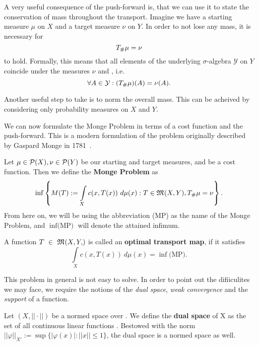 A very useful consequence of the push-forward is, that we can use it to state the conservation of mass throughout the transport. Imagine we have a starting measure $\mu$ on $X$ and a target measure $\nu$ on $Y$. In order to not lose any mass, it is necessary for
\[ {T}_{\#} \mu = \nu \]
to hold. Formally, this means that all elements of the underlying $\sigma$-algebra $\mathcal{Y}$ on $Y$ coincide under the measures $\nu$ and \push{\mu}, i.e.
\[ \forall A \in \mathcal{Y}: ({T}_{\#} \mu)(A) = \nu(A).\]

Another useful step to take is to norm the overall mass. This can be acheived by considering only probability measures on $X$ and $Y$.

We can now formulate the Monge Problem in terms of a cost function and the push-forward. This is a modern formulation of the problem originally described by Gaspard Monge in 1781~\cite{Mon1781}.

\begin{definition}\label{MongeProb}
	Let $\mu \in \mathcal{P}(X), \nu \in \mathcal{P}(Y)$ be our starting and target measures, and  be a cost function. Then we define the \textbf{Monge Problem} as
	\begin{equation}\label{MP}
		\inf \left\{ M(T) := \int\limits_X c(x, T(x))~d\mu(x) : T \in \mathfrak{M}_{}(X, Y), {T}_{\#} \mu = \nu \right\}.
	\end{equation}
	From here on, we will be using the abbreviation (MP) as the name of the Monge Problem, and $\inf \text{(MP)}$ will denote the attained infimum.
\end{definition}

\begin{definition}\label{OTM}
	A function $T~\in~\MF{X, Y}$ is called an \textbf{optimal transport map}, if it satisfies
	\[ \int\limits_X c(x, T(x))~d \mu(x) = \inf \text{(MP)}. \]
\end{definition}

This problem in general is not easy to solve. In order to point out the difiiculites we may face, we require the notions of the \textit{dual space}, \textit{weak convergence} and the \textit{support} of a function.

\begin{definition}\label{DuaSpa}
	Let $(X, ||\cdot||)$ be a normed space over \K. We define the \textbf{dual space} of X as the set of all continuous linear functions . Bestowed with the norm $||\varphi||_{X'} := \sup \{ |\varphi(x)| : ||x|| \le 1 \}$, the dual space is a normed space as well.
\end{definition}


